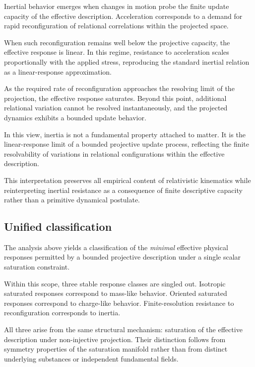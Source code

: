 \documentclass[pdflatex,sn-mathphys-num]{sn-jnl} %
\theoremstyle{remark}
\begin{document}
      Inertial behavior emerges when changes in motion probe the finite update
      capacity of the effective description.
      Acceleration corresponds to a demand for rapid reconfiguration of relational
      correlations within the projected space.

      When such reconfiguration remains well below the projective capacity, the
      effective response is linear.
      In this regime, resistance to acceleration scales proportionally with the
      applied stress, reproducing the standard inertial relation as a linear-response
      approximation.

      As the required rate of reconfiguration approaches the resolving limit of the
      projection, the effective response saturates.
      Beyond this point, additional relational variation cannot be resolved
      instantaneously, and the projected dynamics exhibits a bounded update behavior.

      In this view, inertia is not a fundamental property attached to matter.
      It is the linear-response limit of a bounded projective update process,
      reflecting the finite resolvability of variations in relational configurations
      within the effective description.

      This interpretation preserves all empirical content of relativistic kinematics
      while reinterpreting inertial resistance as a consequence of finite descriptive
      capacity rather than a primitive dynamical postulate.

    \subsection{Unified classification}
      \label{subsec:classification}

      The analysis above yields a classification of the \emph{minimal} effective physical responses
      permitted by a bounded projective description under a single scalar saturation constraint.

      Within this scope, three stable response classes are singled out.
      Isotropic saturated responses correspond to mass-like behavior.
      Oriented saturated responses correspond to charge-like behavior.
      Finite-resolution resistance to reconfiguration corresponds to inertia.

      All three arise from the same structural mechanism: saturation of the effective description
      under non-injective projection.
      Their distinction follows from symmetry properties of the saturation manifold rather than
      from distinct underlying substances or independent fundamental fields.
\end{document}
